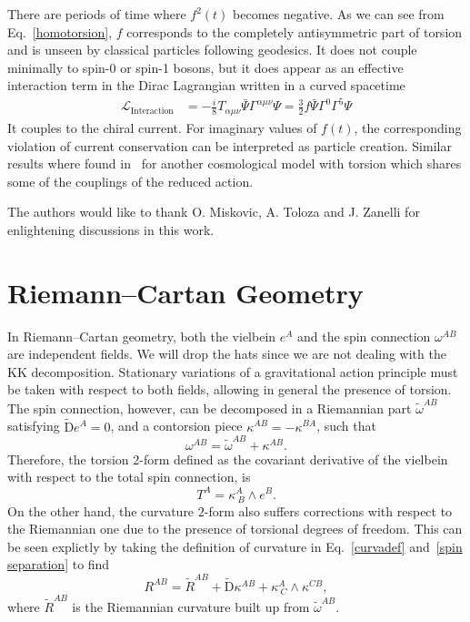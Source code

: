 \documentclass[aps,prd,12pt,superscriptaddress,showpacs,showkeys,longbibliography,reprint,nofootinbib]{revtex4-1}
\begin{document}
There are periods of time where $f^2(t)$ becomes negative. As we can see from Eq.~\eqref{homotorsion}, $f$ corresponds to the completely antisymmetric part of torsion and is unseen by classical particles following geodesics. It does not couple minimally to spin-0 or spin-1 bosons, but it does appear as an effective interaction term in the Dirac Lagrangian written in a curved spacetime~\cite{Hehl:1976kj}
\begin{align*}
  \mathcal{L}_{\text{Interaction}}&=-\frac{i}{8}T_{\alpha\mu\nu}\bar{\Psi}\Gamma^{\alpha\mu\nu}\Psi =\frac{3}{2}f\bar{\Psi}\Gamma^0\Gamma^5\Psi
\end{align*}
It couples to the chiral current. For imaginary values of $f(t)$, the corresponding violation of current conservation can be interpreted as particle creation. Similar results where found in~\cite{Toloza:2013wi} for another cosmological model with torsion which shares some of the couplings of the reduced action. 
\begin{acknowledgments}
  The authors would like to thank O. Miskovic, A. Toloza and J. Zanelli for enlightening discussions in this work.
\end{acknowledgments}


\appendix

\section{Riemann--Cartan Geometry\label{Riemann-Cartan}}

In Riemann--Cartan geometry, both the vielbein $e^A$ and the spin connection $\omega^{AB}$ are independent fields. We will drop the hats since we are not dealing with the KK decomposition. Stationary variations of a gravitational action principle must be taken with respect to both fields, allowing in general the presence of torsion. The spin connection, however, can be decomposed in a Riemannian part $\tilde{\omega}^{AB}$ satisfying $\tilde{\mbox{D}}e^A=0$, and a contorsion piece $\kappa^{AB}=-\kappa^{BA}$, such that 
\begin{equation}\label{spin separation}
  \omega^{AB}=\tilde{\omega}^{AB}+\kappa^{AB}.
\end{equation} 
Therefore, the torsion 2-form defined as the covariant derivative of the vielbein with respect to the total spin connection, is
\begin{equation}
  T^A=\kappa^A_{\ B}\wedge e^B.
\end{equation}
On the other hand, the curvature $2$-form also suffers corrections with respect to the Riemannian one due to the presence of torsional degrees of freedom. This can be seen explictly by taking the definition of curvature in Eq.~\eqref{curvadef} and~\eqref{spin separation} to find
\begin{equation}\label{curvature decomp}
  R^{AB} = \tilde{R}^{AB} + \tilde{\mbox{D}}\kappa^{AB} + \kappa^A_{\ C}\wedge\kappa^{CB},
\end{equation}
where $\tilde{R}^{AB}$ is the Riemannian curvature built up from $\tilde{\omega}^{AB}$.
\end{document}
